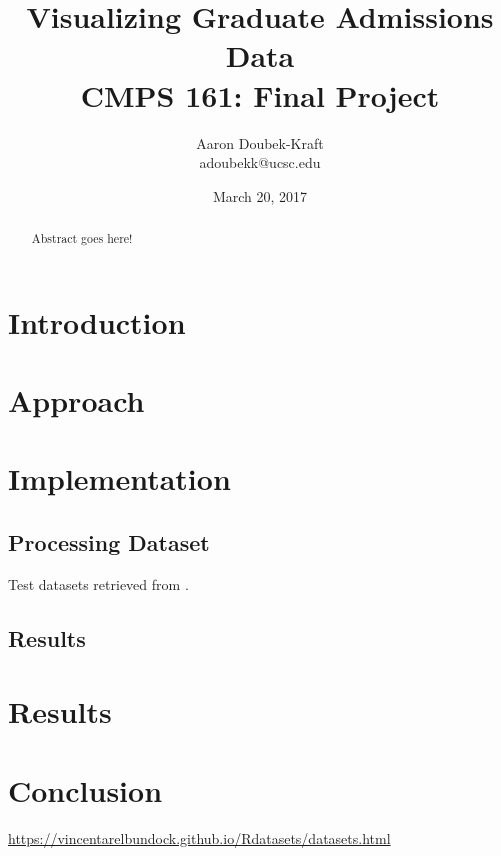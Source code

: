 \documentclass[]{article}
\title{Visualizing Graduate Admissions Data \\ CMPS 161: Final Project}
\author{Aaron Doubek-Kraft \\ adoubekk@ucsc.edu}
\date{March 20, 2017}
\begin{document}
\maketitle

\begin{abstract}
	Abstract goes here!
\end{abstract}

\vfill

\section{Introduction}

\section{Approach}

\section{Implementation}
	\subsection{Processing Dataset}
	Test datasets retrieved from \cite{datasets}.
	\subsection{Results}
	
\section{Results}

\section{Conclusion}

\begin{thebibliography}{11}
		\url{https://vincentarelbundock.github.io/Rdatasets/datasets.html}
\end{thebibliography}
\end{document}
